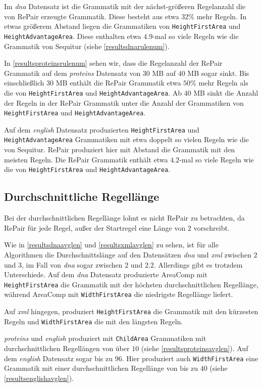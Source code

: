 Im \emph{dna} Datensatz ist die Grammatik mit der nächst-größeren Regelanzahl die von RePair erzeugte Grammatik. Diese besteht aus etwa $32$\% mehr Regeln. In etwas größerem Abstand liegen die Grammatiken von \texttt{HeightFirstArea} und \texttt{HeightAdvantageArea}. Diese enthalten etwa $4.9$-mal so viele Regeln wie die Grammatik von Sequitur (siehe \autoref{resultsdnarulenum}).

In \autoref{resultsproteinsrulenum} sehen wir, dass die Regelanzahl der RePair Grammatik auf dem \emph{proteins} Datensatz von $30$ MB auf $40$ MB sogar sinkt. Bis einschließlich $30$ MB enthält die RePair Grammatik etwa $50$\% mehr Regeln als die von \texttt{HeightFirstArea} und \texttt{HeightAdvantageArea}. Ab $40$ MB sinkt die Anzahl der Regeln in der RePair Grammatik unter die Anzahl der Grammatiken von \texttt{HeightFirstArea} und \texttt{HeightAdvantageArea}.

Auf dem \emph{english} Datensatz produzierten \texttt{HeightFirstArea} und \texttt{HeightAdvantageArea} Grammatiken mit etwa doppelt so vielen Regeln wie die von Sequitur.
RePair produziert hier mit Abstand die Grammatik mit den meisten Regeln. Die RePair Grammatik enthält etwa $4.2$-mal so viele Regeln wie die von \texttt{HeightFirstArea} und \texttt{HeightAdvantageArea}.

\subsection{Durchschnittliche Regellänge}

Bei der durchschnittlichen Regellänge lohnt es nicht RePair zu betrachten, da RePair für jede Regel, außer der Startregel eine Länge von $2$ vorschreibt.

Wie in \autoref{resultsdnaavglen} und \autoref{resultsxmlavglen} zu sehen, ist für alle Algorithmen die Durchschnittslänge auf den Datensätzen \emph{dna} und \emph{xml} zwischen $2$ und $3$, im Fall von \emph{dna} sogar zwischen $2$ und $2.2$. Allerdings gibt es trotzdem Unterschiede. Auf dem \emph{dna} Datensatz produzierte AreaComp mit \texttt{HeightFirstArea} die Grammatik mit der höchsten durchschnittlichen Regellänge, während AreaComp mit \texttt{WidthFirstArea} die niedrigste Regellänge liefert.

Auf \emph{xml} hingegen, produziert \texttt{HeightFirstArea} die Grammatik mit den kürzesten Regeln und \texttt{WidthFirstArea} die mit den längsten Regeln.

\emph{proteins} und \emph{english} produziert mit \texttt{ChildArea} Grammatiken mit durchschnittlichen Regellängen von über $10$ (siehe \autoref{resultsproteinsavglen}). Auf dem \emph{english} Datensatz sogar bis zu $96$.
Hier produziert auch \texttt{WidthFirstArea} eine Grammatik mit einer durchschnittlichen Regellänge von bis zu $40$ (siehe \autoref{resultsenglishavglen}).



